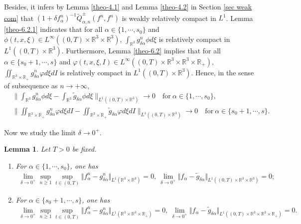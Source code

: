 \documentclass[reqno,11pt]{amsart}
\newtheorem{lemma}{Lemma}[section]
\numberwithin{equation}{section}
\def\R{\mathbb{R}}
\begin{document}
Besides, it infers by Lemma \ref{theo-4.1} and Lemma \ref{theo-4.2} in Section \ref{sec weak com} that $(1+\delta f^n_\alpha )^{-1}\tilde{Q}^{\pm}_{\alpha ,n}(f^n,f^n)$ is weakly relatively compact in $L^1$. Lemma \ref{theo-6.2.1} indicates that for all $\alpha \in \{1,\cdots ,s_0\}$ and $\phi (t, x, \xi) \in L^\infty ((0,T) \times \R^3\times \R^3)$, $ \int_{\R^3} g^n_{\delta \alpha} \phi d\xi $ is relatively compact in $L^1((0,T)\times \R^3)$. Furthermore, Lemma \ref{theo-6.2} implies that for all $\alpha \in \{s_0+1,\cdots ,s\}$ and $\varphi (t, x, \xi, I) \in L^\infty ((0,T)\times \R^3\times \R^3 \times \R_+)$, $ \iint_{\R^3 \times \R_+} g^n_{\delta \alpha} \varphi d\xi dI$ is relatively compact in $L^1((0,T)\times \R^3)$. Hence, in the sense of subsequence as $n \to + \infty$,
\begin{equation}\label{gn converge}
	\begin{aligned}
		& \| \int_{\R^3} g^n_{\delta \alpha} \phi d\xi - \int_{\R^3} \tilde{g}_{\delta \alpha} \phi d\xi \|_{ L^1 ( (0, T) \times \R^3 ) } \to 0 \quad \text{for}\ \alpha \in \{1,\cdots ,s_0\},\\
		& \| \iint_{\R^3\times \R_+} g^n_{\delta \alpha} \varphi d\xi dI - \iint_{\R^3\times \R_+} \tilde{g}_{\delta \alpha} \varphi d\xi dI \|_{ L^1 ( (0, T) \times \R^3 ) } \to 0 \quad \text{for}\ \alpha \in \{s_0+1,\cdots ,s\}.
	\end{aligned}
\end{equation}

Now we study the limit $\delta \to 0^+$.

\begin{lemma}\label{converge f,g}
Let $T >0$ be fixed. 
\begin{enumerate}
\item {For $\alpha \in \{1,\cdots,s_0\}$, one has
	\begin{equation}\label{eq6.77}
	\begin{aligned}
	\lim \limits_{\delta \rightarrow 0^+} \sup \limits_{n\geq 1 } \sup \limits_{t\in (0,T)} \Vert f^n_\alpha -g^n_{\delta \alpha} \Vert_{L^1(\R^3 \times \R^3 )}=0, \ \lim \limits_{\delta \rightarrow 0^+} \Vert f_\alpha - \tilde{g}_{\delta \alpha} \Vert_{L^1( (0, T) \times \R^3 \times \R^3  )}=0;
	\end{aligned}
	\end{equation}}
\item{For $\alpha \in \{s_0+1,\cdots,s\}$, one has
\begin{equation}\label{eq6.76}
		\begin{aligned}
		\lim \limits_{\delta \rightarrow 0^+} \sup \limits_{n\geq 1 } \sup \limits_{t\in (0,T)} \Vert f^n_\alpha -g^n_{\delta \alpha} \Vert_{L^1(\R^3 \times \R^3\times \R_+ )}=0, \ \lim \limits_{\delta \rightarrow 0^+} \Vert f_\alpha - \tilde{g}_{\delta \alpha} \Vert_{L^1( (0, T) \times \R^3 \times \R^3\times \R_+)}=0.
	\end{aligned}
\end{equation}}
\end{enumerate}
\end{lemma}
\end{document}
